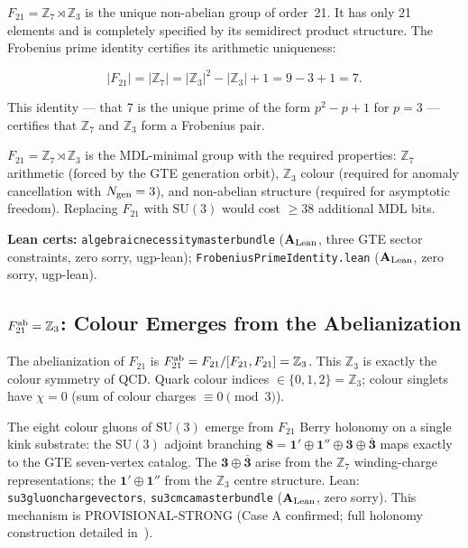 \documentclass[11pt,openany]{book}
\theoremstyle{remark}
\newcommand{\ZS}{\mathbb{Z}_7}
\newcommand{\lean}[1]{%
  \penalty-100
  \begingroup\def\_{\textunderscore\allowbreak}\texttt{#1}\endgroup}
\newcommand{\CatA}{\textbf{A}}
\newcommand{\CatAL}{\ensuremath{\textbf{A}_{\rm Lean}}}
\begin{document}
$F_{21} = \ZS\rtimes\mathbb{Z}_3$ is the unique non-abelian group of order~21.
It has only 21 elements and is completely specified by its semidirect product structure.
The Frobenius prime identity certifies its arithmetic uniqueness:

\begin{equation}
|F_{21}| = |\ZS| = |\mathbb{Z}_3|^2 - |\mathbb{Z}_3| + 1 = 9 - 3 + 1 = 7.
\label{eq:frobenius_prime}
\end{equation}

This identity --- that 7 is the unique prime of the form $p^2 - p + 1$ for $p=3$ ---
certifies that $\ZS$ and $\mathbb{Z}_3$ form a Frobenius pair.

\begin{tcolorbox}[colback=orange!5,colframe=orange!60,
  title={Result: $F_{21}$ Is MDL-Forced (\CatA\ and \CatAL)}]
$F_{21} = \ZS\rtimes\mathbb{Z}_3$ is the MDL-minimal group with the required properties:
$\ZS$ arithmetic (forced by the GTE generation orbit), $\mathbb{Z}_3$ colour
(required for anomaly cancellation with $N_{\rm gen}=3$), and non-abelian structure
(required for asymptotic freedom).
Replacing $F_{21}$ with $\mathrm{SU}(3)$ would cost $\geq 38$ additional MDL bits.

\smallskip\noindent
\textbf{Lean certs:}
\lean{algebraic\_necessity\_master\_bundle} (\CatAL, three GTE sector constraints, zero sorry, ugp-lean);
\lean{FrobeniusPrimeIdentity.lean} (\CatAL, zero sorry, ugp-lean).
\end{tcolorbox}

\subsection*{$F_{21}^{\rm ab} = \mathbb{Z}_3$: Colour Emerges from the Abelianization}

The abelianization of $F_{21}$ is $F_{21}^{\rm ab} = F_{21}/[F_{21},F_{21}] = \mathbb{Z}_3$.
This $\mathbb{Z}_3$ is exactly the colour symmetry of QCD.
Quark colour indices $\in\{0,1,2\} = \mathbb{Z}_3$;
colour singlets have $\chi = 0$ (sum of colour charges $\equiv 0 \pmod{3}$).

The eight colour gluons of $\mathrm{SU}(3)$ emerge from $F_{21}$ Berry holonomy
on a single kink substrate: the $\mathrm{SU}(3)$ adjoint branching
$\mathbf{8} = \mathbf{1}'\oplus\mathbf{1}''\oplus\mathbf{3}\oplus\bar{\mathbf{3}}$
maps exactly to the GTE seven-vertex catalog.
The $\mathbf{3}\oplus\bar{\mathbf{3}}$ arise from the $\ZS$ winding-charge representations;
the $\mathbf{1}'\oplus\mathbf{1}''$ from the $\mathbb{Z}_3$ centre structure.
Lean: \lean{su3\_gluon\_charge\_vectors}, \lean{su3\_cmca\_master\_bundle} (\CatAL, zero sorry).
This mechanism is PROVISIONAL-STRONG (Case A confirmed; full holonomy construction
detailed in~\cite{SpivackGTEQCDStructure}).
\end{document}
